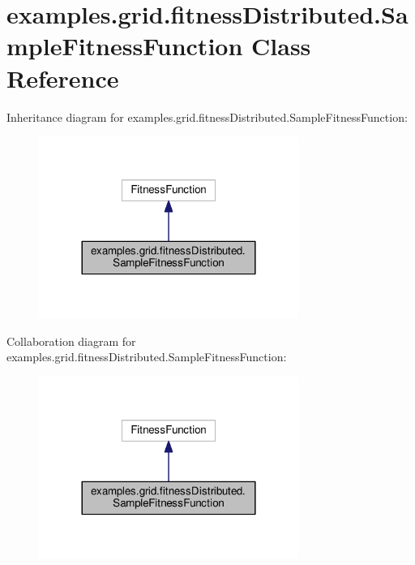 \hypertarget{classexamples_1_1grid_1_1fitness_distributed_1_1_sample_fitness_function}{\section{examples.\-grid.\-fitness\-Distributed.\-Sample\-Fitness\-Function Class Reference}
\label{classexamples_1_1grid_1_1fitness_distributed_1_1_sample_fitness_function}
}


Inheritance diagram for examples.\-grid.\-fitness\-Distributed.\-Sample\-Fitness\-Function\-:
\nopagebreak
\begin{figure}[H]
\begin{center}
\leavevmode
\includegraphics[width=240pt]{classexamples_1_1grid_1_1fitness_distributed_1_1_sample_fitness_function__inherit__graph}
\end{center}
\end{figure}


Collaboration diagram for examples.\-grid.\-fitness\-Distributed.\-Sample\-Fitness\-Function\-:
\nopagebreak
\begin{figure}[H]
\begin{center}
\leavevmode
\includegraphics[width=240pt]{classexamples_1_1grid_1_1fitness_distributed_1_1_sample_fitness_function__coll__graph}
\end{center}
\end{figure}
